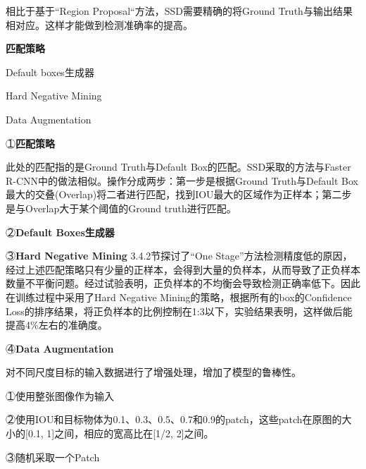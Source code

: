 相比于基于“Region Proposal“方法，SSD需要精确的将Ground Truth与输出结果相对应。这样才能做到检测准确率的提高。

\textbf{匹配策略}

\line

Default boxes生成器

Hard Negative Mining

Data Augmentation

\line

\textcircled{１}\textbf{匹配策略}

此处的匹配指的是Ground Truth与Default Box的匹配。SSD采取的方法与Faster R-CNN中的做法相似。操作分成两步：第一步是根据Ground Truth与Default Box最大的交叠(Overlap)将二者进行匹配，找到IOU最大的区域作为正样本；第二步是与Overlap大于某个阈值的Ground truth进行匹配。

\textcircled{２}\textbf{Default Boxes生成器}

\textcircled{３}\textbf{Hard Negative Mining}
3.4.2节探讨了“One Stage”方法检测精度低的原因，经过上述匹配策略只有少量的正样本，会得到大量的负样本，从而导致了正负样本数量不平衡问题。经过试验表明，正负样本的不均衡会导致检测正确率低下\cite{focal-loss}。因此在训练过程中采用了Hard Negative Mining\cite{hnm}的策略，根据所有的box的Confidence Loss的排序结果，将正负样本的比例控制在1:3以下，实验结果表明，这样做后能提高4\%左右的准确度。

\textcircled{４}\textbf{Data Augmentation}

对不同尺度目标的输入数据进行了增强处理，增加了模型的鲁棒性。

\textcircled{１}使用整张图像作为输入

\textcircled{２}使用IOU和目标物体为0.1、0.3、0.5、0.7和0.9的patch，这些patch在原图的大小的[0.1, 1]之间，相应的宽高比在[1/2, 2]之间。

\textcircled{３}随机采取一个Patch

